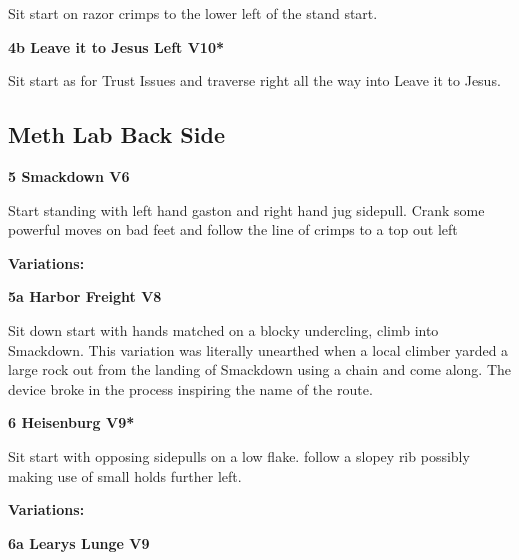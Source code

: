 \begin{multicols}{2}
\begin{adjustwidth}{0.5cm}{}
							\begin{adjustwidth}{0.5cm}{}				
							Sit start on razor crimps to the lower left of the stand start.
							\end{adjustwidth}
							\label{vr:Leave it to Jesus Left}
\colorbox{red!20}{
\parbox{0.95\linewidth}{
\textbf{
4b Leave it to Jesus Left V10*  
}
}
}

							\begin{adjustwidth}{0.5cm}{}				
							Sit start as for Trust Issues and traverse right all the way into Leave it to Jesus.
							\end{adjustwidth}
						\end{adjustwidth}

			\subsection*{Meth Lab Back Side}\label{bf:Meth Lab Back Side}
						
					\label{rt:Smackdown}
\colorbox{RoyalBlue!20}{
\parbox{0.95\linewidth}{
\textbf{
5 Smackdown V6  
}
}
}

					\begin{adjustwidth}{0.5cm}{}				
					Start standing with left hand gaston and right hand jug sidepull. Crank some powerful moves on bad feet and follow the line of crimps to a top out left
					\end{adjustwidth}
						\begin{adjustwidth}{0.5cm}{}				
						\textbf{Variations:} \newline
							\label{vr:Harbor Freight}
\colorbox{Goldenrod!50}{
\parbox{0.95\linewidth}{
\textbf{
5a Harbor Freight V8  
}
}
}

							\begin{adjustwidth}{0.5cm}{}				
							Sit down start with hands matched on a blocky undercling, climb into Smackdown. This variation was literally unearthed when a local climber yarded a large rock out from the landing of Smackdown using a chain and come along. The device broke in the process inspiring the name of the route.
							\end{adjustwidth}
						\end{adjustwidth}
					\label{rt:Heisenburg}
\colorbox{Goldenrod!50}{
\parbox{0.95\linewidth}{
\textbf{
6 Heisenburg V9*  
}
}
}

					\begin{adjustwidth}{0.5cm}{}				
					Sit start with opposing sidepulls on a low flake. follow a slopey rib possibly making use of small holds further left.
					\end{adjustwidth}
						\begin{adjustwidth}{0.5cm}{}				
						\textbf{Variations:} \newline
							\label{vr:Learys Lunge}
\colorbox{Goldenrod!50}{
\parbox{0.95\linewidth}{
\textbf{
6a Learys Lunge V9  
}
}
}


\end{adjustwidth}
\end{multicols}
